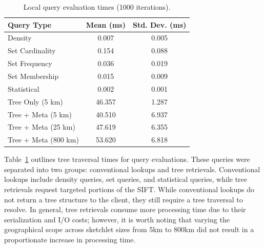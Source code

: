 \documentclass[9pt,journal,compsoc]{IEEEtran}
\begin{document}
\begin{table}
    \renewcommand{\arraystretch}{1.2}
    \caption{Local query evaluation times (1000 iterations). \vspace{-1em}}
    \label{tbl:query-times}
    \begin{center}
        \begin{tabular}{|l|c|c|}
            \hline
            \textbf{Query Type}      & \textbf{Mean (ms)} & \textbf{Std. Dev. (ms)} \\
            \hline
            Density                  & 0.007                    & 0.005 \\
            \hline
            Set Cardinality          & 0.154                    & 0.088 \\
            \hline
            Set Frequency            & 0.036                    & 0.019 \\
            \hline
            Set Membership           & 0.015                    & 0.009 \\
            \hline
            Statistical               & 0.002                    & 0.001 \\
            \hline
            \hline
            Tree Only (5 km)        & 46.357                   & 1.287 \\
            \hline
            Tree + Meta (5 km)      & 40.510                   & 6.937 \\
            \hline
            Tree + Meta (25 km)     & 47.619                   & 6.355 \\
            \hline
            Tree + Meta (800 km)    & 53.620                   & 6.818 \\
            \hline
        \end{tabular}
    \end{center}
    \vspace{-2em}
\end{table}
Table~\ref{tbl:query-times} outlines tree traversal times for query evaluations. These queries were separated into two groups: conventional lookups and tree retrievals. Conventional lookups include density queries, set queries, and statistical queries, while tree retrievals request targeted portions of the SIFT.  While conventional lookups do not return a tree structure to the client, they still require a tree traversal to resolve. In general, tree retrievals consume more processing time due to their serialization and I/O costs; however, it is worth noting that varying the geographical scope across sketchlet sizes from 5km to 800km did not result in a proportionate increase in processing time.
\end{document}
